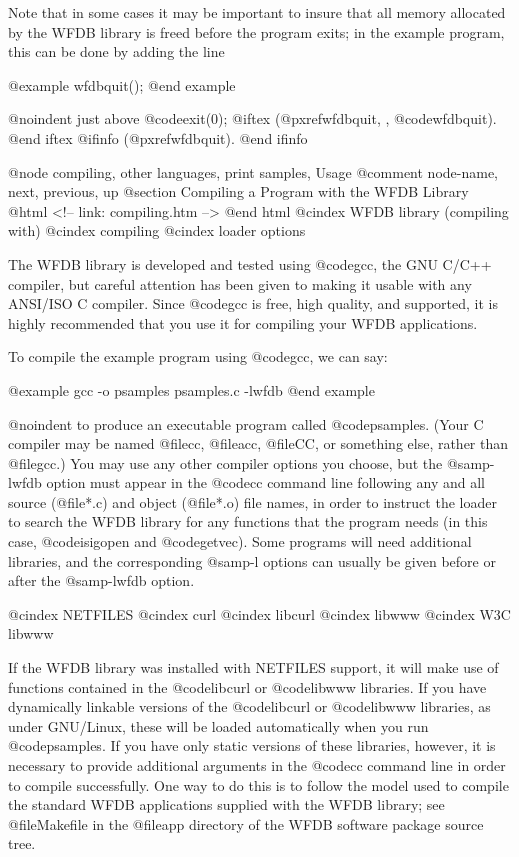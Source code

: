 {{Note that in some cases it may be important to insure that all memory
allocated by the WFDB library is freed before the program exits;  in
the example program, this can be done by adding the line

@example
wfdbquit();
@end example

@noindent
just above @code{exit(0);}
@iftex
(@pxref{wfdbquit, , @code{wfdbquit}}).
@end iftex
@ifinfo
(@pxref{wfdbquit}).
@end ifinfo

@node     compiling, other languages, print samples, Usage
@comment  node-name,  next,  previous,  up
@section Compiling a Program with the WFDB Library
@html
<!-- link: compiling.htm -->
@end html
@cindex WFDB library (compiling with)
@cindex compiling
@cindex loader options

The WFDB library is developed and tested using @code{gcc}, the GNU C/C++
compiler, but careful attention has been given to making it usable with any
ANSI/ISO C compiler.  Since @code{gcc} is free, high quality, and supported, it
is highly recommended that you use it for compiling your WFDB applications.

To compile the example program using @code{gcc}, we can say:

@example
gcc -o psamples psamples.c -lwfdb
@end example

@noindent
to produce an executable program called @code{psamples}.  (Your C
compiler may be named @file{cc}, @file{acc}, @file{CC}, or something
else, rather than @file{gcc}.)  You may use any other compiler
options you choose, but the @samp{-lwfdb} option must appear in the
@code{cc} command line following any and all source (@file{*.c}) and
object (@file{*.o}) file names, in order to instruct the loader to
search the WFDB library for any functions that the program needs (in
this case, @code{isigopen} and @code{getvec}).  Some programs will need
additional libraries, and the corresponding @samp{-l} options can
usually be given before or after the @samp{-lwfdb} option.

@cindex NETFILES
@cindex curl
@cindex libcurl
@cindex libwww
@cindex W3C libwww

If the WFDB library was installed with NETFILES support, it will make use of
functions contained in the @code{libcurl} or @code{libwww} libraries.  If you
have dynamically linkable versions of the @code{libcurl} or @code{libwww}
libraries, as under GNU/Linux, these will be loaded automatically when you run
@code{psamples}.  If you have only static versions of these libraries, however,
it is necessary to provide additional arguments in the @code{cc} command line
in order to compile successfully.  One way to do this is to follow the model
used to compile the standard WFDB applications supplied with the WFDB library;
see @file{Makefile} in the @file{app} directory of the WFDB software package
source tree.

}}
